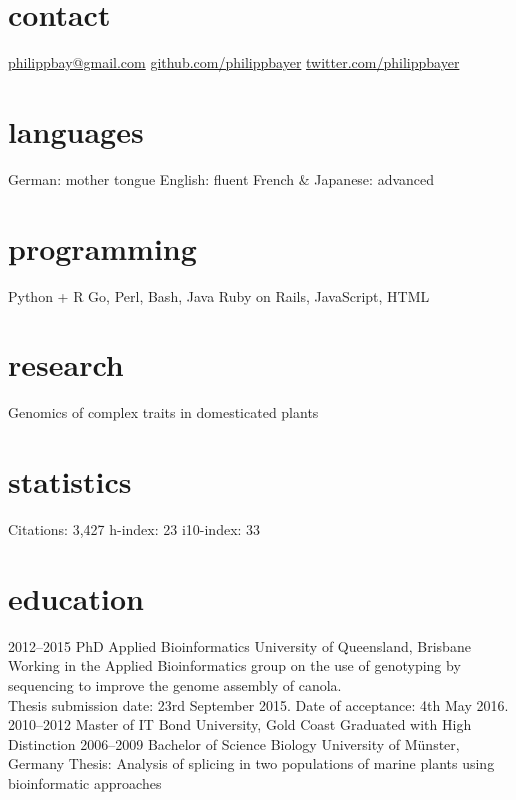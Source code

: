 \documentclass[]{friggeri-cv} %
\begin{document}


\begin{aside} %
\section{contact}
\href{mailto:philippbay@gmail.com}{philippbay@gmail.com}
\href{http://github.com/philippbayer}{github.com/philippbayer}
\href{http://twitter.com/philippbayer}{twitter.com/philippbayer}
\section{languages}
German: mother tongue
English: fluent
French \& Japanese: advanced
\section{programming}
Python + R
Go, Perl, Bash, Java
Ruby on Rails, JavaScript, HTML
\section{research}
Genomics of complex traits in domesticated plants
\section{statistics}
Citations: 3,427
h-index: 23
i10-index: 33
\end{aside}


\section{education}

\begin{entrylist}
\entry
{2012--2015}
{PhD {\normalfont Applied Bioinformatics}}
{University of Queensland, Brisbane}
{Working in the Applied Bioinformatics group on the use of genotyping by sequencing to improve the genome assembly of canola.\\Thesis submission date: 23rd September 2015. Date of acceptance: 4th May 2016.}
\entry
{2010--2012}
{Master {\normalfont of IT}}
{Bond University, Gold Coast}
{Graduated with High Distinction}
\entry
{2006--2009}
{Bachelor of Science {\normalfont Biology}}
{University of Münster, Germany}
{Thesis: Analysis of splicing in two populations of marine plants
using bioinformatic approaches}
\end{entrylist}
\end{document}
